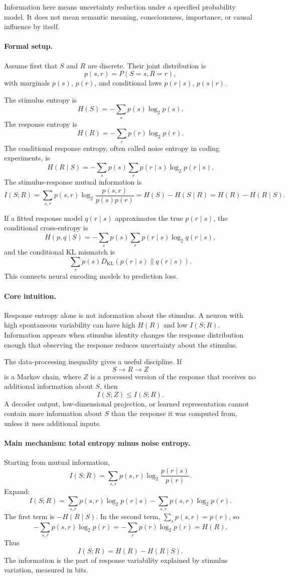 Information here means uncertainty reduction under a specified probability model. It does not mean semantic meaning, consciousness, importance, or causal influence by itself.

\paragraph{Formal setup.}
Assume first that \(S\) and \(R\) are discrete. Their joint distribution is
\[
p(s,r)=P(S=s,R=r),
\]
with marginals \(p(s)\), \(p(r)\), and conditional laws \(p(r\mid s)\), \(p(s\mid r)\).

The stimulus entropy is
\[
H(S)=-\sum_s p(s)\log_2 p(s).
\]
The response entropy is
\[
H(R)=-\sum_r p(r)\log_2 p(r).
\]
The conditional response entropy, often called noise entropy in coding experiments, is
\[
H(R\mid S)=-\sum_s p(s)\sum_r p(r\mid s)\log_2 p(r\mid s).
\]
The stimulus-response mutual information is
\[
\boxed{
I(S;R)=\sum_{s,r}p(s,r)\log_2\frac{p(s,r)}{p(s)p(r)}
=H(S)-H(S\mid R)=H(R)-H(R\mid S).
}
\]

If a fitted response model \(q(r\mid s)\) approximates the true \(p(r\mid s)\), the conditional cross-entropy is
\[
H(p,q\mid S)
=-\sum_s p(s)\sum_r p(r\mid s)\log_2 q(r\mid s),
\]
and the conditional KL mismatch is
\[
\sum_s p(s)D_{\mathrm{KL}}(p(r\mid s)\|q(r\mid s)).
\]
This connects neural encoding models to prediction loss.

\paragraph{Core intuition.}
Response entropy alone is not information about the stimulus. A neuron with high spontaneous variability can have high \(H(R)\) and low \(I(S;R)\). Information appears when stimulus identity changes the response distribution enough that observing the response reduces uncertainty about the stimulus.

The data-processing inequality gives a useful discipline. If
\[
S\to R\to Z
\]
is a Markov chain, where \(Z\) is a processed version of the response that receives no additional information about \(S\), then
\[
I(S;Z)\leq I(S;R).
\]
A decoder output, low-dimensional projection, or learned representation cannot contain more information about \(S\) than the response it was computed from, unless it uses additional inputs.

\paragraph{Main mechanism: total entropy minus noise entropy.}
Starting from mutual information,
\[
I(S;R)=\sum_{s,r}p(s,r)\log_2\frac{p(r\mid s)}{p(r)}.
\]
Expand:
\[
I(S;R)=
\sum_{s,r}p(s,r)\log_2 p(r\mid s)
-
\sum_{s,r}p(s,r)\log_2 p(r).
\]
The first term is \(-H(R\mid S)\). In the second term, \(\sum_s p(s,r)=p(r)\), so
\[
-\sum_{s,r}p(s,r)\log_2 p(r)
=-\sum_r p(r)\log_2 p(r)
=H(R).
\]
Thus
\[
\boxed{I(S;R)=H(R)-H(R\mid S).}
\]
The information is the part of response variability explained by stimulus variation, measured in bits.

